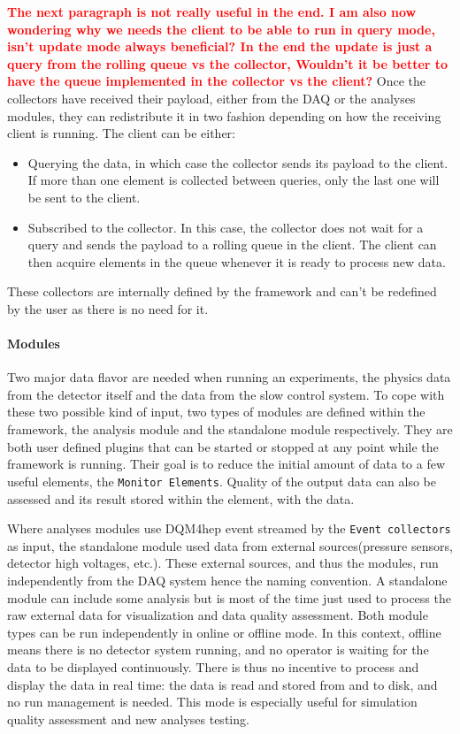 \documentclass{webofc}
\begin{document}
\textcolor{red}{\textbf{The next paragraph is not really useful in the end. I am also now wondering why we needs the client to be able to run in query mode, isn't update mode always beneficial? In the end the update is just a query from the rolling queue vs the collector, Wouldn't it be better to have the queue implemented in the collector vs the client?}}
Once the collectors have received their payload, either from the DAQ or the analyses modules, they can redistribute it in two fashion depending on how the receiving client is running. The client can be either:

\begin{itemize}
  \item Querying the data, in which case the collector sends its payload to the client. If more than one element is collected between queries, only the last one will be sent to the client.
  \item Subscribed to the collector. In this case, the collector does not wait for a query and sends the payload to a rolling queue in the client. The client can then acquire elements in the queue whenever it is ready to process new data.  
\end{itemize}

These collectors are internally defined by the framework and can't be redefined by the user as there is no need for it. 

\paragraph{Modules}\label{par:Modules}
Two major data flavor are needed when running an experiments, the physics data from the detector itself and the data from the slow control system.
To cope with these two possible kind of input, two types of modules are defined within the framework, the analysis module and the standalone module respectively.
They are both user defined plugins that can be started or stopped at any point while the framework is running.
Their goal is to reduce the initial amount of data to a few useful elements, the \texttt{Monitor Elements}.
Quality of the output data can also be assessed and its result stored within the element, with the data.

Where analyses modules use DQM4hep event streamed by the \texttt{Event collectors} as input, the standalone module 
used data from external sources(pressure sensors, detector high voltages, etc.).
These external sources, and thus the modules, run independently from the DAQ system hence the naming convention. 
A standalone module can include some analysis but is most of the time just used to process the raw external data for visualization and data quality assessment. 
Both module types can be run independently in online or offline mode. In this context, offline means there is no detector system running, and no operator is waiting for the data to be displayed continuously. There is thus no incentive to process and display the data in real time: the data is read and stored from and to disk, and no run management is needed. This mode is especially useful for simulation quality assessment and new analyses testing. 
\end{document}
